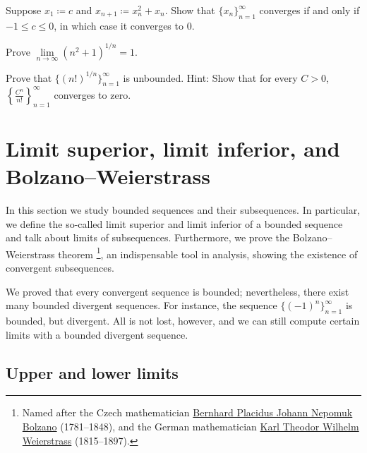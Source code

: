 \begin{exercise} \label{exercise:convergentinitialvalues}
Suppose $x_1 \coloneqq c$ and $x_{n+1} \coloneqq x_n^2+x_n$.
Show that $\{ x_n \}_{n=1}^\infty$ converges if and only if $-1 \leq c \leq 0$, in which
case it converges to 0.
\end{exercise}

\begin{exercise}
Prove $\lim\limits_{n \to \infty} {(n^2+1)}^{1/n} = 1$.
\end{exercise}

\begin{exercise}
Prove that $\bigl\{ {(n!)}^{1/n} \bigr\}_{n=1}^\infty$
is unbounded.
Hint: Show that for every $C > 0$, $\left\{ \frac{C^n}{n!}
\right\}_{n=1}^\infty$ converges to zero.
\end{exercise}


\sectionnewpage
\section{Limit superior, limit inferior, and Bolzano--Weierstrass}
\label{sec:bw}



In this section we study bounded sequences and their subsequences.
In particular, we define the so-called limit superior and limit inferior
of a bounded sequence and talk about limits of subsequences.
Furthermore, we prove the
Bolzano--Weierstrass theorem%
\footnote{%
Named after the Czech mathematician
\href{https://en.wikipedia.org/wiki/Bernard_Bolzano}{Bernhard Placidus Johann Nepomuk Bolzano}
(1781--1848), and the German mathematician
\href{https://en.wikipedia.org/wiki/Karl_Weierstrass}{Karl Theodor Wilhelm Weierstrass}
(1815--1897).}, an
indispensable tool in analysis, showing the existence of convergent
subsequences.

We proved that every convergent sequence is bounded; nevertheless,
there exist many bounded divergent sequences.  For instance,
the sequence $\bigl\{ {(-1)}^n \bigr\}_{n=1}^\infty$ is bounded,
but divergent.  All is not lost, however, and we can
still compute certain limits with a bounded divergent sequence.

\subsection{Upper and lower limits}

